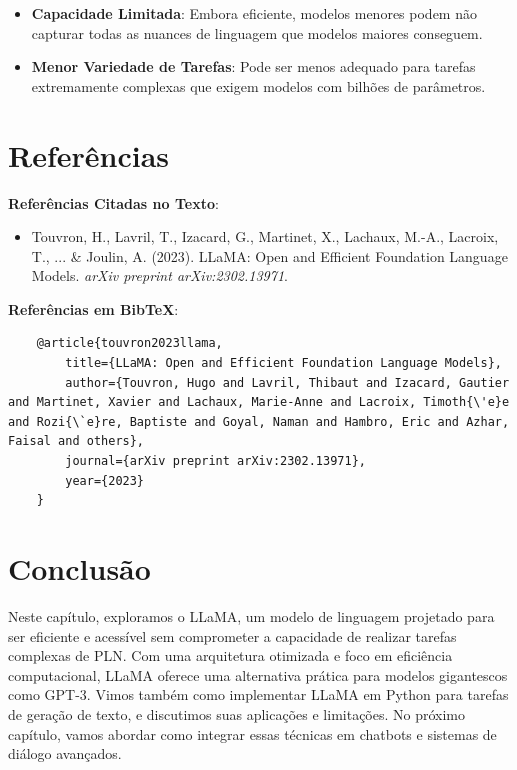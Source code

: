 \documentclass[14pt,a4paper,oneside]{book}
\begin{document}
\begin{itemize}
	\item \textbf{Capacidade Limitada}: Embora eficiente, modelos menores podem não capturar todas as nuances de linguagem que modelos maiores conseguem.
	\item \textbf{Menor Variedade de Tarefas}: Pode ser menos adequado para tarefas extremamente complexas que exigem modelos com bilhões de parâmetros.
\end{itemize}

\section{Referências}

\textbf{Referências Citadas no Texto}:

\begin{itemize}
	\item Touvron, H., Lavril, T., Izacard, G., Martinet, X., Lachaux, M.-A., Lacroix, T., ... \& Joulin, A. (2023). LLaMA: Open and Efficient Foundation Language Models. \textit{arXiv preprint arXiv:2302.13971}.
\end{itemize}

\textbf{Referências em BibTeX}:

\begin{verbatim}
	@article{touvron2023llama,
		title={LLaMA: Open and Efficient Foundation Language Models},
		author={Touvron, Hugo and Lavril, Thibaut and Izacard, Gautier and Martinet, Xavier and Lachaux, Marie-Anne and Lacroix, Timoth{\'e}e and Rozi{\`e}re, Baptiste and Goyal, Naman and Hambro, Eric and Azhar, Faisal and others},
		journal={arXiv preprint arXiv:2302.13971},
		year={2023}
	}
\end{verbatim}

\section{Conclusão}

Neste capítulo, exploramos o LLaMA, um modelo de linguagem projetado para ser eficiente e acessível sem comprometer a capacidade de realizar tarefas complexas de PLN. Com uma arquitetura otimizada e foco em eficiência computacional, LLaMA oferece uma alternativa prática para modelos gigantescos como GPT-3. Vimos também como implementar LLaMA em Python para tarefas de geração de texto, e discutimos suas aplicações e limitações. No próximo capítulo, vamos abordar como integrar essas técnicas em chatbots e sistemas de diálogo avançados.
\end{document}
